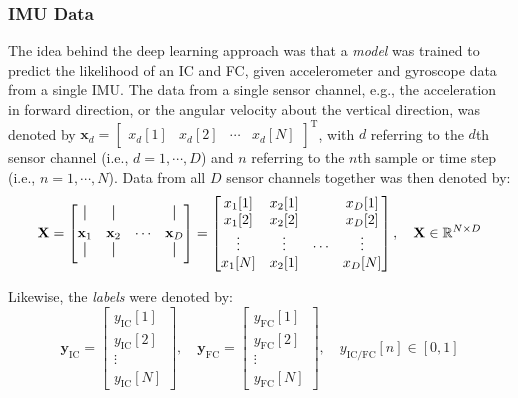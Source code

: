 \documentclass[sensors,article,submit,pdftex,moreauthors]{Definitions/mdpi}
\begin{document}
\subsubsection{IMU Data \label{subsubsec:IMU_Data}}
The idea behind the deep learning approach was that a \emph{model} was trained to predict the likelihood of an IC and FC, given accelerometer and gyroscope data from a single IMU. The data from a single sensor channel, e.g., the acceleration in forward direction, or the angular velocity about the vertical direction, was denoted by $\mathbf{x}_{d} = \begin{bmatrix}
x_{d}[1] & x_{d}[2] & \cdots & x_{d}[N]
\end{bmatrix}^{\mathrm{T}}$, with $d$ referring to the $d$th sensor channel (i.e., $d = 1, \cdots, D$) and $n$ referring to the $n$th sample or time step (i.e., $n = 1, \cdots, N$). Data from all $D$ sensor channels together was then denoted by:
\begin{equation}
	\mathbf{X} = \begin{bmatrix}
		\rule[0ex]{0.5pt}{2.5ex} & \rule[0ex]{0.5pt}{2.5ex} &  & \rule[0ex]{0.5pt}{2.5ex}\\
		\mathbf{x}_{1} & \mathbf{x}_{2} & \cdots & \mathbf{x}_{D}\\
		\rule[0ex]{0.5pt}{2.5ex} & \rule[0ex]{0.5pt}{2.5ex} &  & \rule[0ex]{0.5pt}{2.5ex}
		\end{bmatrix} = \begin{bmatrix}
		x_{1}[1] & x_{2}[1] & & x_{D}[1]\\
		x_{1}[2] & x_{2}[2] & & x_{D}[2]\\
		\vdots & \vdots & \cdots & \vdots\\
		x_{1}[N] & x_{2}[1] & & x_{D}[N]\end{bmatrix}, \quad \mathbf{X} \in \mathbb{R}^{N \times D}
	\label{eqn:train_data_single_instance}
\end{equation}

Likewise, the \emph{labels} were denoted by:
\begin{equation}
	\mathbf{y}_{\mathrm{IC}} = \begin{bmatrix}
		y_{\mathrm{IC}}[1]\\
		y_{\mathrm{IC}}[2]\\
		\vdots\\
		y_{\mathrm{IC}}[N]
		\end{bmatrix}, \quad \mathbf{y}_{\mathrm{FC}} = \begin{bmatrix}
		y_{\mathrm{FC}}[1]\\
		y_{\mathrm{FC}}[2]\\
		\vdots\\
		y_{\mathrm{FC}}[N]
		\end{bmatrix}, \quad y_{\mathrm{IC}/\mathrm{FC}}[n] \in [0, 1]
	\label{eqn:train_labels_single_instance}
\end{equation}
\end{document}

